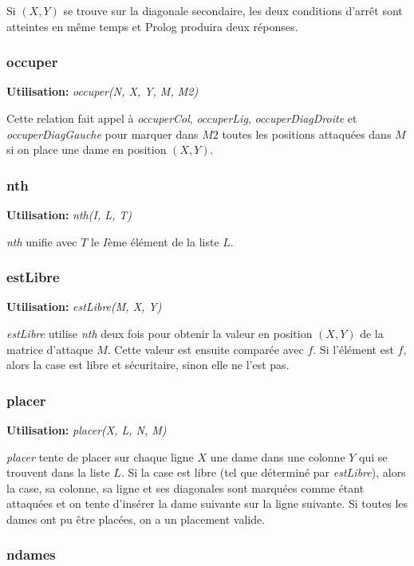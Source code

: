 \documentclass[10pt]{article}
\newcommand{\usage}[1]{\textbf{Utilisation: }\emph{#1}}
\begin{document}
Si $(X,Y)$ se trouve sur la diagonale secondaire, les deux conditions
d'arrêt sont atteintes en même temps et Prolog produira deux réponses.

\subsubsection{occuper}

\usage{occuper(N, X, Y, M, M2)}

Cette relation fait appel à \emph{occuperCol}, \emph{occuperLig},
\emph{occuperDiagDroite} et \emph{occuperDiagGauche} pour marquer dans
$M2$ toutes les positions attaquées dans $M$ si on place une dame en
position $(X,Y)$.

\subsubsection{nth}

\usage{nth(I, L, T)}

\emph{nth} unifie avec $T$ le $I$ème élément de la liste $L$.

\subsubsection{estLibre}

\usage{estLibre(M, X, Y)}

\emph{estLibre} utilise \emph{nth} deux fois pour obtenir la valeur en
position $(X, Y)$ de la matrice d'attaque $M$. Cette valeur est
ensuite comparée avec $f$. Si l'élément est $f$, alors la case est
libre et sécuritaire, sinon elle ne l'est pas.

\subsubsection{placer}

\usage{placer(X, L, N, M)}

\emph{placer} tente de placer sur chaque ligne $X$ une dame dans une
colonne $Y$ qui se trouvent dans la liste $L$. Si la case est libre
(tel que déterminé par \emph{estLibre}), alors la case, sa colonne, sa
ligne et ses diagonales sont marquées comme étant attaquées et on
tente d'insérer la dame suivante sur la ligne suivante. Si toutes les
dames ont pu être placées, on a un placement valide.


\subsubsection{ndames}
\end{document}
